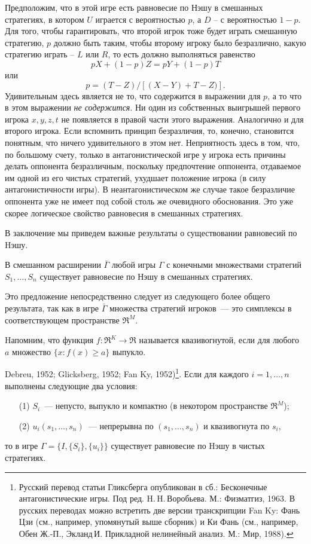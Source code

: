 {Предположим, что в этой игре есть равновесие по Нэшу в смешанных
стратегиях, в котором $U$ играется с вероятностью $p$, а $D$ --
с вероятностью $1-p$. Для того, чтобы гарантировать, что второй
игрок тоже будет играть смешанную стратегию, $p$ должно быть таким,
чтобы второму игроку было безразлично, какую стратегию играть --
$L$ или $R$, то есть должно выполняться равенство
$$pX+(1-p)Z=pY+(1-p)T$$
или
$$p=(T-Z)/[(X-Y)+T-Z)].$$
Удивительным здесь является не то, что содержится в выражении для
$p$, а то что в этом выражении \emph{не содержится}. Ни один из
собственных выигрышей первого игрока $x, y, z, t$ не появляется
в правой части этого выражения. Аналогично и для второго игрока.
Если вспомнить принцип безразличия, то, конечно, становится понятным,
что ничего удивительного в этом нет. Неприятность здесь в том, что,
по большому счету, только в антагонистической игре у игрока есть
причины делать оппонента безразличным, поскольку предпочтение
оппонента, отдаваемое им одной из его чистых стратегий, ухудшает
положение игрока (в силу антагонистичности игры). В неантагонистическом
же случае такое безразличие оппонента уже не имеет под собой столь же
очевидного обоснования. Это уже скорее логическое свойство
равновесия в смешанных стратегиях.

В заключение мы приведем важные результаты о существовании
равновесий по Hэшу.

\begin{proposition}
В смешанном расширении $\bar\Gamma$ любой игры $\Gamma$ с конечными
множествами стратегий $S_1,\ldots,S_n$ существует равновесие по Нэшу
в смешанных стратегиях.
\end{proposition}

Это предложение непосредственно следует из следующего более общего
результата, так как в игре $\bar\Gamma$ множества стратегий
игроков~--- это симплексы в соответствующем пространстве $\Re^M$.

Hапомним, что функция $f:\Re^K\to\Re$ называется квазивогнутой, если
для любого $a$ множество $\{x:f(x)\ge a\}$ выпукло.

\begin{theorem}
{\rm Debreu, 1952; Glicksberg, 1952; Fan Ky, 1952)}\footnote{
Русский перевод статьи Гликсберга опубликован в сб.: Бесконечные
антагонистические игры. Под ред. H.\,H.\,Воробьева. М.: Физматгиз,
1963. В русских переводах можно встретить две версии транскрипции
Fan Ky: Фань Цзи (см., например, упомянутый выше сборник) и Ки Фань
(см., например, Обен Ж.-П., Экланд\,И. Прикладной нелинейный анализ.
М.: Мир, 1988).}. Если для каждого $i=1,\ldots,n$ выполнены следующие
два условия:
\begin{itemize}
\item[(1)] $S_i$~--- непусто, выпукло и компактно (в некотором
пространстве $\Re^M$);
\item[(2)] $u_i(s_1,\ldots,s_n)$~--- непрерывна по $(s_1,\ldots,s_n)$ и
квазивогнута по $s_i$, \end{itemize} то в игре
$\Gamma=\{I,\{S_i\},\{u_i\}\}$ существует равновесие по Hэшу в
чистых стратегиях.
\end{theorem}


}
